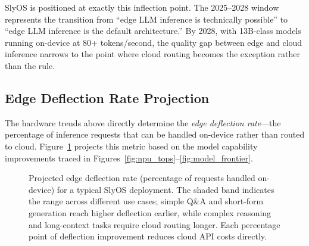\documentclass[12pt, letterpaper, twoside]{report}
\begin{document}
SlyOS is positioned at exactly this inflection point. The 2025--2028 window represents the transition from ``edge LLM inference is technically possible'' to ``edge LLM inference is the default architecture.'' By 2028, with 13B-class models running on-device at 80+ tokens/second, the quality gap between edge and cloud inference narrows to the point where cloud routing becomes the exception rather than the rule.

\subsection{Edge Deflection Rate Projection}

The hardware trends above directly determine the \textit{edge deflection rate}---the percentage of inference requests that can be handled on-device rather than routed to cloud. Figure~\ref{fig:deflection} projects this metric based on the model capability improvements traced in Figures~\ref{fig:npu_tops}--\ref{fig:model_frontier}.

\begin{figure}[H]
\centering
{}
\caption{Projected edge deflection rate (percentage of requests handled on-device) for a typical SlyOS deployment. The shaded band indicates the range across different use cases; simple Q\&A and short-form generation reach higher deflection earlier, while complex reasoning and long-context tasks require cloud routing longer. Each percentage point of deflection improvement reduces cloud API costs directly.}
\label{fig:deflection}
\end{figure}
\end{document}
